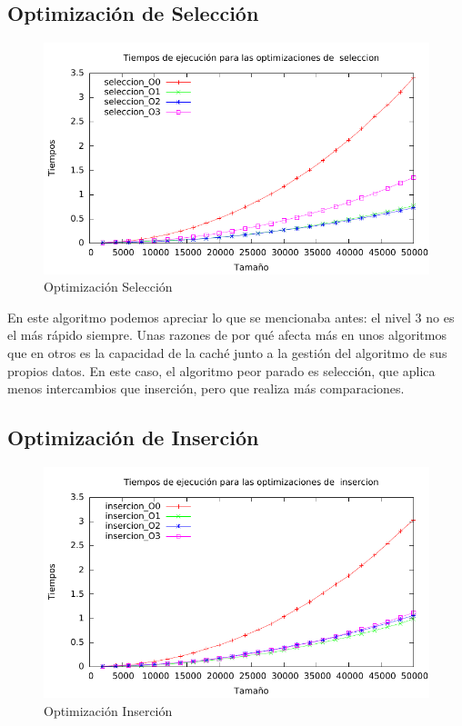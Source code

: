\documentclass[a4paper, 11pt]{article}
\begin{document}
\newpage 
\subsection{Optimización de Selección}

\begin{figure}[H]\includegraphics[width=13cm]{img/seleccion_optim_g.pdf} \centering
	\caption{Optimización Selección}\end{figure}

En este algoritmo podemos apreciar lo que se mencionaba antes: el nivel 3 no es el más rápido siempre. Unas razones de por qué afecta más en unos algoritmos que en otros es la capacidad de la caché junto a la gestión del algoritmo de sus propios datos. En este caso, el algoritmo peor parado es selección, que aplica menos intercambios que inserción, pero que realiza más comparaciones.

\newpage
\subsection{Optimización de Inserción}

\begin{figure}[H]\includegraphics[width=13cm]{img/insercion_optim_g.pdf} \centering
	\caption{Optimización Inserción}\end{figure}
\end{document}
